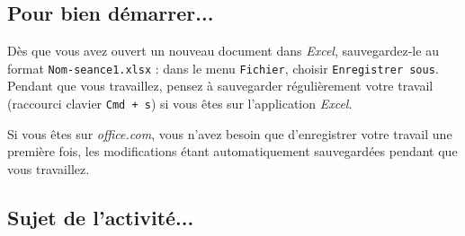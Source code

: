 \vspace{12pt}

\subsection{Pour bien démarrer...}

\vspace{10pt}

Dès que vous avez ouvert un nouveau document dans \emph{Excel}, sauvegardez-le au format \texttt{Nom-seance1.xlsx} : dans le menu \texttt{Fichier}, choisir \texttt{Enregistrer sous}. Pendant que vous travaillez, pensez à sauvegarder régulièrement votre travail (raccourci clavier \texttt{Cmd + s}) si vous êtes sur l'application \emph{Excel}.


Si vous êtes sur \emph{office.com}, vous n'avez besoin que d'enregistrer votre travail une première fois, les modifications étant automatiquement sauvegardées pendant que vous travaillez.


\subsection{Sujet de l'activité...}

\vspace{10pt}


